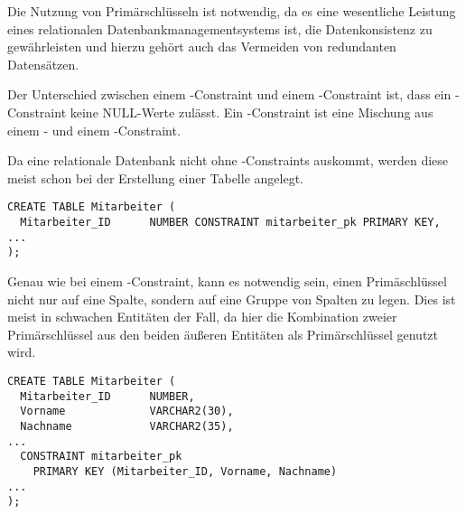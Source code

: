         Die Nutzung von Prim\"arschl\"usseln ist notwendig, da es eine wesentliche Leistung eines relationalen Datenbankmanagementsystems ist, die Datenkonsistenz zu gew\"ahrleisten und hierzu geh\"ort auch das Vermeiden von redundanten Datens\"atzen.
        \begin{merke}
          Der Unterschied zwischen einem \UNIQUE-Constraint und einem \PRIMARYKEY-Constraint ist, dass ein \PRIMARYKEY-Constraint keine NULL-Werte zul\"asst. Ein \PRIMARYKEY-Constraint ist eine Mischung aus einem \NOTNULL- und einem \UNIQUE-Constraint.
        \end{merke}
        Da eine relationale Datenbank nicht ohne \PRIMARYKEY-Constraints
        auskommt, werden diese meist schon bei der Erstellung einer Tabelle
        angelegt.
\clearpage
        \begin{lstlisting}[language=oracle_sql,caption={Ein PRIMARY KEY-Constraint als Inline Constraint anlegen},label=sql09_13]
CREATE TABLE Mitarbeiter (
  Mitarbeiter_ID      NUMBER CONSTRAINT mitarbeiter_pk PRIMARY KEY,
...
);
        \end{lstlisting}
        Genau wie bei einem \UNIQUE-Constraint, kann es notwendig sein, einen Prim\"aschl\"ussel nicht nur auf eine Spalte, sondern auf eine Gruppe von Spalten zu legen. Dies ist meist in schwachen Entit\"aten der Fall, da hier die Kombination zweier Prim\"arschl\"ussel aus den beiden \"au\ss eren Entit\"aten als Prim\"arschl\"ussel genutzt wird.
        \begin{lstlisting}[language=oracle_sql,caption={Ein PRIMARY KEY-Constraint als Out Of Line Constraint auf mehrere Spalten anlegen},label=sql09_14]
CREATE TABLE Mitarbeiter (
  Mitarbeiter_ID      NUMBER,
  Vorname             VARCHAR2(30),
  Nachname            VARCHAR2(35),
...
  CONSTRAINT mitarbeiter_pk
    PRIMARY KEY (Mitarbeiter_ID, Vorname, Nachname)
...
);
        \end{lstlisting}

